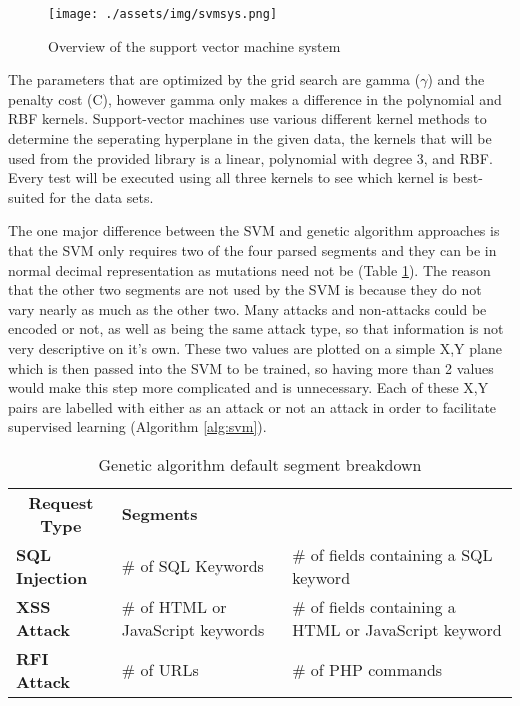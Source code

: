 \begin{figure}
	\texttt{[image: ./assets/img/svmsys.png]}
	\caption{Overview of the support vector machine system}
	\label{fig:svmsys}
\end{figure}

The parameters that are optimized by the grid search are gamma ($\gamma$) and the penalty cost (C), however gamma only makes a difference in the polynomial and RBF kernels.  Support-vector machines use various different kernel methods to determine the seperating hyperplane in the given data, the kernels that will be used from the provided library is a linear, polynomial with degree 3, and RBF.  Every test will be executed using all three kernels to see which kernel is best-suited for the data sets.  

The one major difference between the SVM and genetic algorithm approaches is that the SVM only requires two of the four parsed segments and they can be in normal decimal representation as mutations need not be (Table \ref{tab:svmSegments}).  The reason that the other two segments are not used by the SVM is because they do not vary nearly as much as the other two.  Many attacks and non-attacks could be encoded or not, as well as being the same attack type, so that information is not very descriptive on it's own.  These two values are plotted on a simple X,Y plane which is then passed into the SVM to be trained, so having more than 2 values would make this step more complicated and is unnecessary.  Each of these X,Y pairs are labelled with either as an attack or not an attack in order to facilitate supervised learning (Algorithm \ref{alg:svm}).

\begin{table}
	\begin{tabular}{|p{1.5in}|p{2in}|p{2in}|}
	\hline
	\multicolumn{1}{|c|}{\textbf{Request Type}} & \multicolumn{2}{p{4in}|}{\textbf{Segments}}               \\ \hhline{|=|=|=|}
	\textbf{SQL Injection}                      & \# of SQL Keywords         & \# of fields containing a SQL keyword \\ \hline
	\textbf{XSS Attack}                      & \# of HTML or JavaScript keywords         & \# of fields containing a HTML or JavaScript keyword \\ \hline
	\textbf{RFI Attack}                      & \# of URLs         & \# of PHP commands \\ \hline
	\end{tabular}
	\caption{Genetic algorithm default segment breakdown}
	\label{tab:svmSegments}
\end{table}

